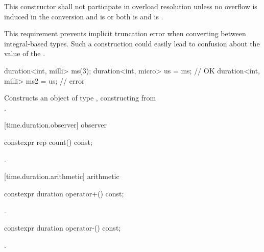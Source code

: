\begin{itemdescr}
\pnum
\remarks This constructor shall not participate in overload resolution unless
no overflow is induced in the conversion and
 is  or both
 is  and
 is . \begin{note} This
requirement prevents implicit truncation error when converting between
integral-based  types. Such a construction could easily lead to
confusion about the value of the . \end{note}
\begin{example}
\begin{codeblock}
duration<int, milli> ms(3);
duration<int, micro> us = ms;       // OK
duration<int, milli> ms2 = us;      // error
\end{codeblock}
\end{example}

\pnum
\effects Constructs an object of type , constructing  from\\
.
\end{itemdescr}

[time.duration.observer]{ observer}

%
\begin{itemdecl}
constexpr rep count() const;
\end{itemdecl}

\begin{itemdescr}
\pnum
\returns {}.
\end{itemdescr}

[time.duration.arithmetic]{ arithmetic}

%
\begin{itemdecl}
constexpr duration operator+() const;
\end{itemdecl}

\begin{itemdescr}
\pnum
\returns {}.
\end{itemdescr}

%
\begin{itemdecl}
constexpr duration operator-() const;
\end{itemdecl}

\begin{itemdescr}
\pnum
\returns {}.
\end{itemdescr}

